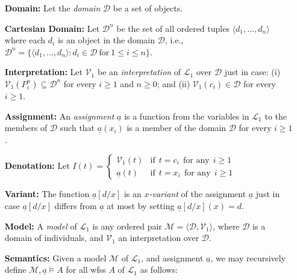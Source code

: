 \documentclass[a4paper, 11pt]{article} %
\newcommand{\tuple}[1]{\langle#1\rangle} %
\newcommand{\set}[1]{\lbrace#1\rbrace} %
\begin{document}
\begin{enumerate}[leftmargin=1.2in,labelsep=.15in] %
\item[\bf Domain:] Let the \textit{domain} $\mathcal{D}$ be a set of objects.%
\item[\bf Cartesian Domain:] Let $\mathcal{D}^n$ be the set of all ordered tuples $\tuple{d_1,\dots,d_n}$ where each $d_i$ is an object in the domain $\mathcal{D}$, i.e., $\mathcal{D}^n=\set{\tuple{d_1,\dots,d_n}:d_i\in\mathcal{D}~\text{for}~1\leq i\leq n}$.
\item[\bf Interpretation:] Let $\mathcal{V}_1$ be an \textit{interpretation} of $\mathcal{L}_1$ over $\mathcal{D}$ just in case: (i) $\mathcal{V}_1(P_i^n)\subseteq\mathcal{D}^n$ for every $i\geq1$ and $n\geq0$; and (ii) $\mathcal{V}_1(c_i)\in\mathcal{D}$ for every $i\geq1$.
\item[\bf Assignment:] An \textit{assignment} $\underline{a}$ is a function from the variables in $\mathcal{L}_1$ to the members of $\mathcal{D}$ such that $\underline{a}(x_i)$ is a member of the domain $\mathcal{D}$ for every $i\geq1$.
\item[\bf Denotation:] Let $I(t)=
	\begin{cases} 
		\mathcal{V}_1(t) & \text{if}~~ t=c_i ~~\text{for any}~~ i\geq1\\
		\underline{a}(t) & \text{if}~~ t=x_i ~~\text{for any}~~ i\geq1
	\end{cases}$
\item[\bf Variant:] The function $\underline{a}[d/x]$ is an \textit{$x$-variant} of the assignment $\underline{a}$ just in case $\underline{a}[d/x]$ differs from $\underline{a}$ at most by setting $\underline{a}[d/x](x)=d$.
\item[\bf Model:] A \textit{model} of $\mathcal{L}_1$ is any ordered pair $\mathcal{M}=\tuple{\mathcal{D},\mathcal{V}_1}$, where $\mathcal{D}$ is a domain of individuals, and $\mathcal{V}_1$ an interpretation over $\mathcal{D}$.
\item[\bf Semantics:] Given a model $\mathcal{M}$ of $\mathcal{L}_1$, and assignment $\underline{a}$, we may recursively define $\mathcal{M},\underline{a}\vDash A$ for all wfss $A$ of $\mathcal{L}_1$ as follows:

\end{enumerate}
\end{document}
